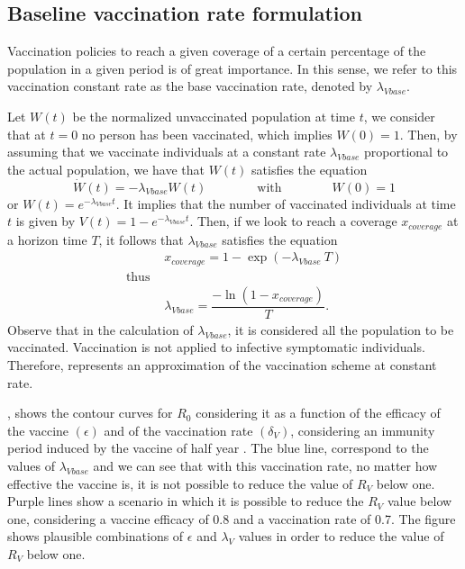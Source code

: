 \subsection{Baseline vaccination rate formulation}
Vaccination policies to reach a given coverage of a
certain percentage of the population in a given period is of great importance.
In this sense, we refer to this vaccination constant rate as the base vaccination
rate, denoted by $ \lambda_{Vbase}$.

Let $W(t)$ be the normalized unvaccinated population at time $t$, we consider
that at $t=0$ no person has been vaccinated, which implies $W(0)=1$.
Then, by assuming that we vaccinate individuals at a constant rate $\lambda_{Vbase}$
proportional to the actual population, we have that $W(t)$ satisfies the equation
$$
\dot{W}(t)=-\lambda_{Vbase} W(t)
\qquad \qquad \textrm{with} \qquad\qquad {W(0)=1}
$$
or $W(t)=e^{-\lambda_{Vbase}t}$. It implies that the number of vaccinated individuals
at time $t$ is given by $V(t)=1-e^{-\lambda_{Vbase}t}$. Then, if we look
to reach a coverage $x_{coverage}$ at a horizon time $T$, it follows that $\lambda_{Vbase}$
satisfies the equation
\begin{equation}
    \label{eqn:lambda_base}
    \begin{aligned}
        & x_{coverage} =
            1 - \exp(-\lambda_{Vbase} \ T)
        \\
        \textrm{thus }&
        \\
        & \lambda_{Vbase} =
            \dfrac{
                -\ln{(1 - x_{coverage})}
            }{T} .
    \end{aligned}
\end{equation}
Observe that in the calculation of $\lambda_{Vbase}$, it is considered all
the population to be vaccinated. Vaccination is not applied to infective symptomatic
individuals. Therefore,  represents an approximation
of the vaccination scheme at constant rate.

, shows the contour curves for $ R_0 $ considering it as a function
of the efficacy of the vaccine $ (\epsilon) $ and of the vaccination rate $ (\delta_V) $,
considering an immunity period induced by the vaccine of half year . The blue line,
correspond to the values of $\lambda_{Vbase}$ and we can see that with
this vaccination rate, no matter how effective the vaccine is, it is not possible
to reduce the value of $R_V$ below one. Purple lines show a scenario in
which it is possible to reduce the $R_V$ value below one, considering a vaccine efficacy of
\num{0.8} and a  vaccination rate of \num{0.7}.
The figure shows plausible combinations of $\epsilon$ and $\lambda_V$ values
in order to reduce the value of $R_V$ below one.

